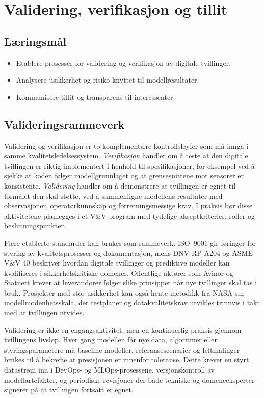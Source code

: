 \chapter{Validering, verifikasjon og tillit}


\section{Læringsmål}
\begin{itemize}
    \item Etablere prosesser for validering og verifikasjon av digitale tvillinger.
    \item Analysere usikkerhet og risiko knyttet til modellresultater.
    \item Kommunisere tillit og transparens til interessenter.
\end{itemize}

\section{Valideringsrammeverk}
Validering og verifikasjon er to komplementære kontrollsløyfer som må inngå i samme kvalitetsledelsessystem. \textit{Verifikasjon} handler om å teste at den digitale tvillingen er riktig implementert i henhold til spesifikasjoner, for eksempel ved å sjekke at koden følger modellgrunnlaget og at grensesnittene mot sensorer er konsistente. \textit{Validering} handler om å demonstrere at tvillingen er egnet til formålet den skal støtte, ved å sammenligne modellens resultater med observasjoner, operatørkunnskap og forretningsmessige krav. I praksis bør disse aktivitetene planlegges i et V\&V-program med tydelige akseptkriterier, roller og beslutningspunkter.

Flere etablerte standarder kan brukes som rammeverk. ISO~9001 gir føringer for styring av kvalitetsprosesser og dokumentasjon, mens DNV-RP-A204 og ASME V\&V 40 beskriver hvordan digitale tvillinger og prediktive modeller kan kvalifiseres i sikkerhetskritiske domener. Offentlige aktører som Avinor og Statnett krever at leverandører følger slike prinsipper når nye tvillinger skal tas i bruk. Prosjekter med stor usikkerhet kan også hente metodikk fra NASA sin modellmodenhetsskala, der testplaner og datakvalitetskrav utvikles trinnvis i takt med at tvillingen utvides.

Validering er ikke en engangsaktivitet, men en kontinuerlig praksis gjennom tvillingens livsløp. Hver gang modellen får nye data, algoritmer eller styringsparametere må baseline-modeller, referansescenarier og feltmålinger brukes til å bekrefte at presisjonen er innenfor toleranse. Dette krever en styrt datastrøm inn i DevOps- og MLOps-prosessene, versjonskontroll av modellartefakter, og periodiske revisjoner der både tekniske og domeneeksperter signerer på at tvillingen fortsatt er egnet.

